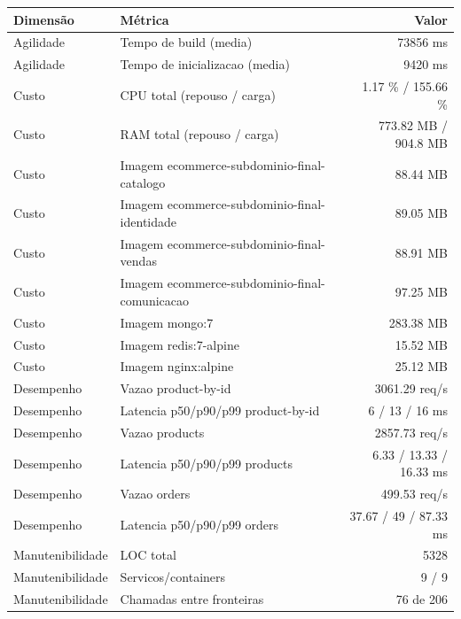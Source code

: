 \begin{quadro}[htb]
  \centering
  \caption{Métricas (ecommerce, subdominio, final).}
  \label{qua:metricas-ecommerce-subdominio-final}
  \renewcommand{\arraystretch}{1.15}
  \begin{tabular}{|l|l|r|}
    \hline
    \textbf{Dimensão} & \textbf{Métrica} & \textbf{Valor} \\
    \hline
    Agilidade & Tempo de build (media) & 73856 ms \\ \hline
    Agilidade & Tempo de inicializacao (media) & 9420 ms \\ \hline
    Custo & CPU total (repouso / carga) & 1.17 \% / 155.66 \% \\ \hline
    Custo & RAM total (repouso / carga) & 773.82 MB / 904.8 MB \\ \hline
    Custo & Imagem ecommerce-subdominio-final-catalogo & 88.44 MB \\ \hline
    Custo & Imagem ecommerce-subdominio-final-identidade & 89.05 MB \\ \hline
    Custo & Imagem ecommerce-subdominio-final-vendas & 88.91 MB \\ \hline
    Custo & Imagem ecommerce-subdominio-final-comunicacao & 97.25 MB \\ \hline
    Custo & Imagem mongo:7 & 283.38 MB \\ \hline
    Custo & Imagem redis:7-alpine & 15.52 MB \\ \hline
    Custo & Imagem nginx:alpine & 25.12 MB \\ \hline
    Desempenho & Vazao product-by-id & 3061.29 req/s \\ \hline
    Desempenho & Latencia p50/p90/p99 product-by-id & 6 / 13 / 16 ms \\ \hline
    Desempenho & Vazao products & 2857.73 req/s \\ \hline
    Desempenho & Latencia p50/p90/p99 products & 6.33 / 13.33 / 16.33 ms \\ \hline
    Desempenho & Vazao orders & 499.53 req/s \\ \hline
    Desempenho & Latencia p50/p90/p99 orders & 37.67 / 49 / 87.33 ms \\ \hline
    Manutenibilidade & LOC total & 5328 \\ \hline
    Manutenibilidade & Servicos/containers & 9 / 9 \\ \hline
    Manutenibilidade & Chamadas entre fronteiras & 76 de 206 \\ \hline
  \end{tabular}
\end{quadro}

